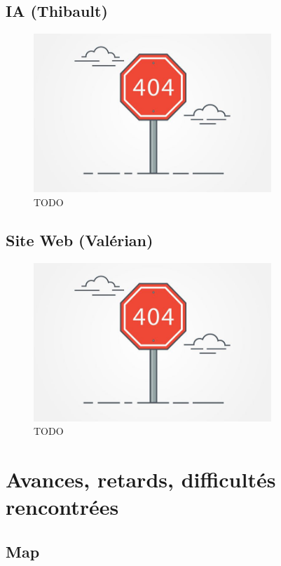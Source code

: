 \documentclass[12pt]{report}
\begin{document}
\section{IA (Thibault)}

\begin{figure}[H]
    \centering
    \includegraphics[width=0.8\textwidth]{404}
    \caption{TODO}
\end{figure}

\section{Site Web (Valérian)}

\begin{figure}[H]
    \centering
    \includegraphics[width=0.8\textwidth]{404}
    \caption{TODO}
\end{figure}

\chapter{Avances, retards, difficultés rencontrées}

\section*{Map}
\end{document}
